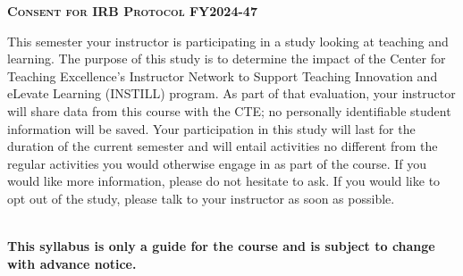 \documentclass[11pt]{article}
\begin{document}
\newpage

\textbf{\textsc{Consent for IRB Protocol FY2024-47}}
\begin{adjustwidth}{1cm}{0cm}
  This semester your instructor is participating in a study looking at teaching and learning. The purpose of this study is to determine the impact of the Center for Teaching Excellence's Instructor Network to Support Teaching Innovation and eLevate Learning (INSTILL) program. As part of that evaluation, your instructor will share data from this course with the CTE; no personally identifiable student information will be saved. Your participation in this study will last for the duration of the current semester and will entail activities no different from the regular activities you would otherwise engage in as part of the course. If you would like more information, please do not hesitate to ask.  If you would like to opt out of the study, please talk to your instructor as soon as possible.
\end{adjustwidth}

~\\
\textbf{This syllabus is only a guide for the course and is subject to change with advance notice.}
\end{document}
